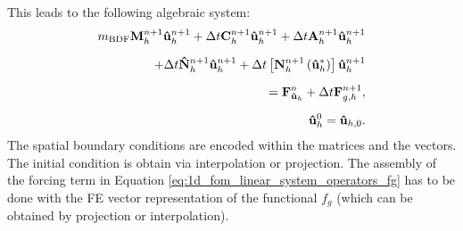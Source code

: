 \documentclass[../../thesis.tex]{subfiles}
\newcommand{\dt}{\ensuremath{\Delta t}}
\begin{document}
This leads to the following algebraic system:
\begin{subequations}
    \begin{align}
        \label{eq:1d_fom_weak_formulation_discrete}
        m_{\text{BDF}} \vb{M}^{n+1}_h \vb{\hat{u}}_{h}^{n+1} 
        + \dt \vb{C}^{n+1}_h \vb{\hat{u}}_{h}^{n+1} 
        + \dt \vb{A}^{n+1}_h \vb{\hat{u}}_{h}^{n+1} 
        \nonumber 
        \\[2mm] 
        + \dt \vb{\hat{N}}^{n+1}_h \vb{\hat{u}}_{h}^{n+1} 
        + \dt \left[\vb{N}^{n+1}_h\left(\vb{\hat{u}}_{h}^{*}\right)\right] \vb{\hat{u}}_{h}^{n+1} 
        \nonumber
        \\[2mm] 
        = \vb{F}_{\vb{\hat{u}}_h}^{n}
        + \dt \vb{F}_{g,h}^{n+1}, 
        \\[2mm]
        \vb{\hat{u}}_h^{0} = \vb{\hat{u}}_{h,0}.
    \end{align}
\end{subequations}
The spatial boundary conditions are encoded within the matrices and the vectors. 
The initial condition is obtain via interpolation or projection.
The assembly of the forcing term in Equation \eqref{eq:1d_fom_linear_system_operators_fg}
has to be done with the FE vector representation of the functional $f_g$ 
(which can be obtained by projection or interpolation).
\end{document}

